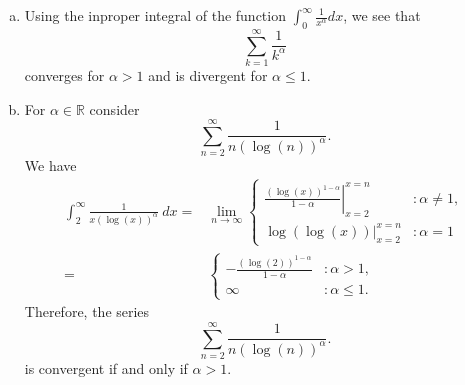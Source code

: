 \begin{example}
\begin{enumerate}[a)]
\item Using the inproper integral of the function $\int_0^\infty \frac{1}{x^\alpha} dx$, we see that
\[\sum_{k=1}^\infty\frac1{k^\alpha}\]
converges for $\alpha>1$ and is divergent for $\alpha\leq1$.
\item For $\alpha\in\mathbb{R}$ consider
\[\sum_{n=2}^\infty\frac1{n(\log(n))^\alpha}.\]
We have
\[
\begin{aligned}
\int_2^\infty\frac1{x(\log(x))^\alpha}~dx=&\lim_{n\to\infty}\begin{cases}\left.\frac{(\log(x))^{1-\alpha}}{1-\alpha}\right|_{x=2}^{x=n}&:\alpha\neq1,\\
\left.\log(\log(x))\right|_{x=2}^{x=n}&:\alpha=1\end{cases}\\
=&\begin{cases}-\frac{(\log(2))^{1-\alpha}}{1-\alpha}&:\alpha>1,\\
\infty&:\alpha\leq1.\end{cases}
\end{aligned}
\]
Therefore, the series \[\sum_{n=2}^\infty\frac1{n(\log(n))^\alpha}.\]
is convergent if and only if $\alpha>1$.
\end{enumerate}
\end{example}

